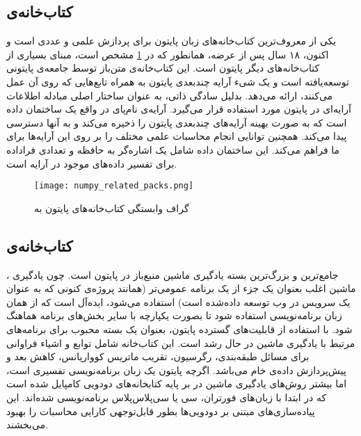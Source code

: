 \subsection{کتاب‌خانه‌ی }
 یکی از معروف‌ترین کتاب‌خانه‌های زبان پایتون برای پردازش علمی و عددی است و اکنون، ۱۸ سال پس از عرضه، همانطور که در \cref{fig:numpy_related_packs}\cite{van2011numpy} مشخص است، مبنای بسیاری از کتاب‌خانه‌های دیگر پایتون است. این کتاب‌خانه‌ی متن‌باز توسط جامعه‌ی پایتونی توسعه‌یافته است و یک شیء آرایه چندبعدی پایتون به همراه تابع‌هایی که روی آن عمل می‌کنند، ارائه می‌دهد.  بدلیل سادگی ذاتی، به عنوان ساختار اصلی مبادله اطلاعات آرایه‌ای در پایتون مورد استفاده قرار می‌گیرد\cite{harris2020array}. آرایه‌ی نام‌پای در واقع یک ساختمان داده است که به صورت بهینه آرایه‌های چند‌بعدی پایتون را ذخیره می‌کند و به آنها دسترسی پیدا می‌کند. همچنین توانایی انجام محاسبات علمی مختلف را بر روی این آرایه‌ها برای ما فراهم می‌کند. این ساختمان داده شامل یک اشاره‌گر به حافظه و تعدادی فراداده برای تفسیر داده‌های موجود در آرایه است\cite{harris2020array, van2011numpy}.

\begin{figure}[!h]
\centerline{\texttt{[image: numpy\_related\_packs.png]}}
\caption{گراف وابستگی کتاب‌خانه‌های پایتون به \cite{van2011numpy}}
\label{fig:numpy_related_packs}
\end{figure}

\subsection{کتاب‌خانه‌ی } 
، جامع‌ترین و بزرگ‌ترین بسته یادگیری ماشین منبع‌باز در پایتون است. چون یادگیری ماشین اغلب بعنوان یک جزء از یک برنامه عمومی‌تر (همانند پروژه‌ی کنونی که به عنوان یک سرویس در وب توسعه داده‌شده است) استفاده می‌شود، ایده‌آل است که از همان زبان برنامه‌نویسی استفاده شود تا بصورت یکپارچه با سایر بخش‌های برنامه هماهنگ شود. با استفاده از قابلیت‌های گسترده پایتون،  بعنوان یک بسته محبوب برای برنامه‌های مرتبط با یادگیری ماشین در حال رشد است\cite{hao2019machine}. این کتاب‌خانه شامل توابع و اشیاء فراوانی برای مسائل طبقه‌بندی، رگرسیون، تقریب ماتریس کوواریانس، کاهش بعد و پیش‌پردازش داده‌ی خام می‌باشد\cite{kramer2016scikit}. اگرچه پایتون یک زبان برنامه‌نویسی تفسیری است، اما بیشتر روش‌های یادگیری ماشین در  بر پایه کتابخانه‌های دودویی کامپایل شده است که در ابتدا با زبان‌های فورتران، سی یا سی‌پلاس‌پلاس برنامه‌نویسی شده‌اند. این پیاده‌سازی‌های مبتنی بر دودویی‌ها بطور قابل‌توجهی کارایی محاسبات را بهبود می‌بخشند\cite{hao2019machine, kramer2016scikit}.

